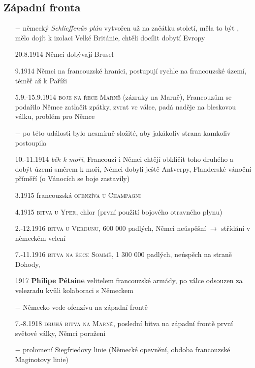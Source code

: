 \documentclass{article}
\begin{document}
\subsection*{Západní fronta}
\begin{itemize}
    \vspace{-0.5em}
    \setlength\itemsep{0.15em}
    \item[$-$] německý \textit{Schlieffenův plán} vytvořen už na začátku století, měla to být , mělo dojít k izolaci Velké Británie, chtěli docílit dobytí Evropy
    \item[20.8.1914] Němci dobývají Brusel
    \item[9.1914] Němci na francouzské hranici, postupují rychle na francouzské území, téměř až k Paříži
    \item[5.9.-15.9.1914] \textsc{boje na řece Marně} (zázraky na Marně), Francouzům se podařilo Němce zatlačit zpátky, zvrat ve válce, padá naděje na bleskovou válku, problém pro Němce
    \item[$-$] po této události bylo nesmírně složité, aby jakákoliv strana kamkoliv postoupila
    \item[10.-11.1914] \textit{běh k moři}, Francouzi i Němci chtějí obklíčit toho druhého a dobýt území směrem k moři, Němci dobyli ještě Antverpy, Flanderské vánoční příměří (o Vánocích se boje zastavily)
    \item[3.1915] francouzská \textsc{ofenzíva u Champagni}
    \item[4.1915] \textsc{bitva u Yper}, chlor (první použití bojového otravného plynu)
    \item[2.-12.1916]  \textsc{bitva u Verdunu}, 600 000 padlých, Němci neúspěšní $\rightarrow$ střídání v německém velení
    \item[7.-11.1916] \textsc{bitva na řece Sommě}, 1 300 000 padlých, neúspěch na straně Dohody,
    \item[1917] \textbf{Philipe Pétaine}  velitelem francouzské armády, po válce odsouzen za velezradu kvůli kolaboraci s Německem
    \item[$-$] Německo vede ofenzívu na západní frontě
    \item[7.-8.1918] \textsc{druhá bitva na Marně}, poslední bitva na západní frontě první světové války, Němci poraženi
    \item[$-$] prolomení Siegfriedovy linie (Německé opevnění, obdoba francouzské Maginotovy linie)
\end{itemize}
\end{document}
